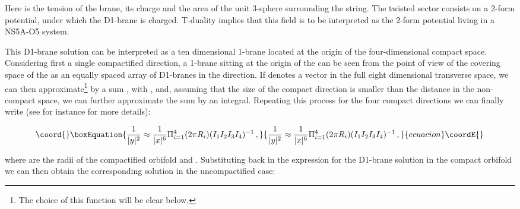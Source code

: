 \documentclass[12pt,a4paper]{article}
\begin{document}
\noindent
Here \coordHE{} is the tension of the brane, \coordHE{} its charge and
\coordHE{} the area of the unit 3-sphere surrounding the string.
The twisted sector consists on a 2-form potential, under which the
D1-brane is charged. T-duality implies that this field
is to be interpreted as the 2-form potential living in a NS5A-O5
system.

This D1-brane solution can be interpreted as a ten dimensional 1-brane
located at the origin of the four-dimensional compact space.
Considering first a single compactified direction, a 1-brane sitting
at the origin of the \coordHE{} can be seen from the point of view of the
covering space of the \coordHE{} 
as an equally spaced array of D1-branes in the \coordHE{} direction. If
\coordHE{} denotes a vector in the full eight dimensional transverse
space, we can then approximate\footnote{The choice of this function will 
be clear below.}
\coordHE{} by a sum \coordHE{}, with \coordHE{}, 
and, assuming that the size of the compact direction is smaller than
the distance in the non-compact space, we can further approximate the
sum by an integral. Repeating this process for the four compact directions
we can finally write (see 
for instance \cite{Ricc} for more details):

\begin{equation}\coord{}\boxEquation{
\frac{1}{|y|^2}\approx \frac{1}{|x|^6}\Pi_{i=1}^4 (2\pi R_i)
(I_1 I_2 I_3 I_4)^{-1}\, ,
}{
\frac{1}{|y|^2}\approx \frac{1}{|x|^6}\Pi_{i=1}^4 (2\pi R_i)
(I_1 I_2 I_3 I_4)^{-1}\, ,
}{ecuacion}\coordE{}\end{equation}

\noindent where \coordHE{} are the radii of the compactified orbifold and
\coordHE{}.
Substituting back in the expression for the D1-brane solution in the
compact orbifold we can then obtain the corresponding 
solution in the uncompactified
case:
\end{document}

